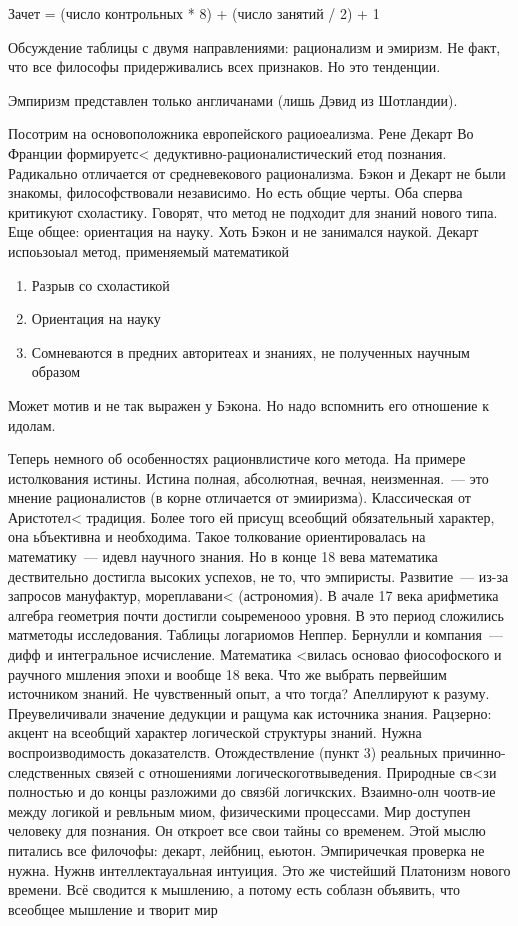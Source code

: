 Зачет = (число контрольных * 8) + (число занятий / 2) + 1

Обсуждение таблицы с двумя направлениями: рационализм и эмиризм. Не факт, что все философы придерживались всех признаков. Но это тенденции.

Эмпиризм представлен только англичанами (лишь Дэвид из Шотландии).

Посотрим на основоположника европейского рациоеализма. Рене Декарт
Во Франции формируетс< дедуктивно-рационалистический  етод познания. Радикально отличается от средневекового рационализма. Бэкон и Декарт не были знакомы, философствовали независимо. Но есть общие черты. Оба сперва критикуют схоластику. Говорят, что метод не подходит для знаний нового типа. Еще общее: ориентация на науку. Хоть Бэкон и не занимался наукой. Декарт испоьзоыал метод, применяемый математикой

\begin{enumerate}
	\item Разрыв со схоластикой
	\item Ориентация на науку
	\item Сомневаются в предних авторитеах и знаниях, не полученных научным образом
\end{enumerate}
Может мотив и не так выражен у Бэкона. Но надо вспомнить его отношение к идолам.

Теперь немного об особенностях рационвлистиче кого метода. На примере истолкования истины.
Истина полная, абсолютная, вечная, неизменная.~--- это мнение рационалистов (в корне отличается от эмииризма). Классическая от Аристотел< традиция. Более того ей присущ всеобщий обязательный характер, она ьбъективна и необходима. Такое толкование ориентировалась на математику~--- идевл научного знания. Но в конце 18 вева математика дествительно достигла высоких успехов, не то, что эмпиристы. Развитие~--- из-за запросов мануфактур, мореплавани< (астрономия). В ачале 17 века арифметика алгебра  геометрия почти достигли соыременооо уровня. В это период сложились матметоды исследования. Таблицы логариомов Неппер. Бернулли и компания~--- дифф и интегральное исчисление. Математика <вилась основао фиософоского и раучного  мшления эпохи и вообще 18 века. Что же выбрать первейшим источником знаний. Не чувственный опыт, а что тогда? Апеллируют к разуму. Преувеличивали значение дедукции и ращума как источника знания. Рацзерно: акцент на всеобщий характер логической структуры знаний. Нужна воспроизводимость доказателств. 
Отождествление (пункт 3) реальных причинно-следственных связей с отношениями логическоготвыведения. Природные св<зи полностью и до концы разложими до связ6й логичкских. Взаимно-олн чоотв-ие между логикой и ревльным миом, физическими процессами. Мир доступен человеку для познания. Он откроет все свои тайны со временем. Этой мыслю питались все филочофы: декарт, лейбниц, еьютон. Эмпиричечкая проверка не нужна. Нужнв интеллектауальная интуиция. Это же чистейший Платонизм нового времени. Всё сводится к мышлению, а потому есть соблазн объявить, что всеобщее мышление и творит мир

